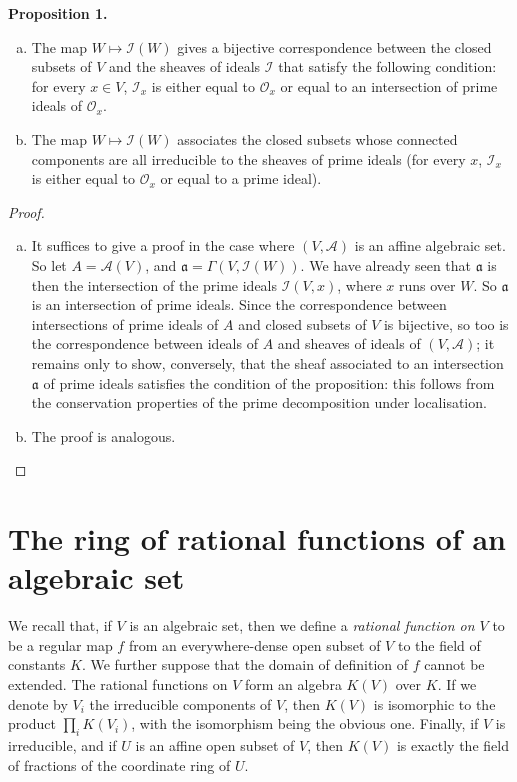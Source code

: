 \documentclass{article}
\newenvironment{itenv}[1]
  {\par\medskip\noindent\textbf{#1.}\itshape}
  {\medskip}
\newcommand{\scr}[1]{{\mathscr{#1}}}
\begin{document}
\begin{itenv}{Proposition 1}
\label{proposition1}
  \begin{enumerate}[(a)]
    \item The map $W\mapsto\scr{I}(W)$ gives a bijective correspondence between the closed subsets of $V$ and the sheaves of ideals $\scr{I}$ that satisfy the following condition:
      for every $x\in V$, $\scr{I}_x$ is either equal to $\scr{O}_x$ or equal to an intersection of prime ideals of $\scr{O}_x$.
    \item The map $W\mapsto\scr{I}(W)$ associates the closed subsets whose connected components are all irreducible to the sheaves of prime ideals (for every $x$, $\scr{I}_x$ is either equal to $\scr{O}_x$ or equal to a prime ideal).
  \end{enumerate}
\end{itenv}

\begin{proof}
  \begin{enumerate}[(a)]
    \item It suffices to give a proof in the case where $(V,\scr{A})$ is an affine algebraic set.
      So let $A=\scr{A}(V)$, and $\mathfrak{a}=\Gamma(V,\scr{I}(W))$.
      We have already seen that $\mathfrak{a}$ is then the intersection of the prime ideals $\scr{I}(V,x)$, where $x$ runs over $W$.
      So $\mathfrak{a}$ is an intersection of prime ideals.
      Since the correspondence between intersections of prime ideals of $A$ and closed subsets of $V$ is bijective, so too is the correspondence between ideals of $A$ and sheaves of ideals of $(V,\scr{A})$;
      it remains only to show, conversely, that the sheaf associated to an intersection $\mathfrak{a}$ of prime ideals satisfies the condition of the proposition: this follows from the conservation properties of the prime decomposition under localisation.
    \item The proof is analogous.
  \end{enumerate}
\end{proof}


\section{The ring of rational functions of an algebraic set}
\label{section3}

We recall that, if $V$ is an algebraic set, then we define a \emph{rational function on $V$} to be a regular map $f$ from an everywhere-dense open subset of $V$ to the field of constants $K$.
We further suppose that the domain of definition of $f$ cannot be extended.
The rational functions on $V$ form an algebra $K(V)$ over $K$.
If we denote by $V_i$ the irreducible components of $V$, then $K(V)$ is isomorphic to the product $\prod_i K(V_i)$, with the isomorphism being the obvious one.
Finally, if $V$ is irreducible, and if $U$ is an affine open subset of $V$, then $K(V)$ is exactly the field of fractions of the coordinate ring of $U$.
\end{document}
